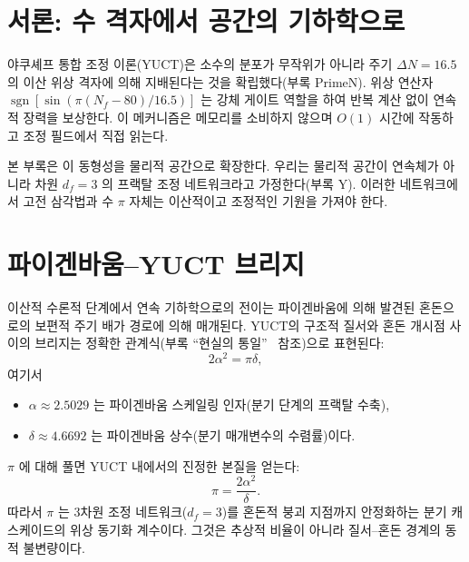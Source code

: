 \documentclass[12pt,a4paper]{article}
\newcommand{\df}{d_{\!f}}
\begin{document}
	\tableofcontents
	\newpage
	
	\section{서론: 수 격자에서 공간의 기하학으로}
	
	야쿠셰프 통합 조정 이론(YUCT)은 소수의 분포가 무작위가 아니라 주기 $\Delta N = 16.5$ 의 이산 위상 격자에 의해 지배된다는 것을 확립했다(부록 PrimeN). 위상 연산자 $\operatorname{sgn}[\sin(\pi(N_f-80)/16.5)]$ 는 강체 게이트 역할을 하여 반복 계산 없이 연속적 장력을 보상한다. 이 메커니즘은 메모리를 소비하지 않으며 $O(1)$ 시간에 작동하고 조정 필드에서 직접 읽는다.
	
	본 부록은 이 동형성을 물리적 공간으로 확장한다. 우리는 물리적 공간이 연속체가 아니라 차원 $\df=3$ 의 프랙탈 조정 네트워크라고 가정한다(부록 Y). 이러한 네트워크에서 고전 삼각법과 수 $\pi$ 자체는 이산적이고 조정적인 기원을 가져야 한다.
	
	\section{파이겐바움–YUCT 브리지}
	\label{sec:bridge}
	
	이산적 수론적 단계에서 연속 기하학으로의 전이는 파이겐바움에 의해 발견된 혼돈으로의 보편적 주기 배가 경로에 의해 매개된다. YUCT의 구조적 질서와 혼돈 개시점 사이의 브리지는 정확한 관계식(부록 ``현실의 통일''~\cite{UnityReality} 참조)으로 표현된다:
	\begin{equation}
		2\alpha^2 = \pi\delta,
		\label{eq:bridge}
	\end{equation}
	여기서
	\begin{itemize}
		\item $\alpha \approx 2.5029$ 는 파이겐바움 스케일링 인자(분기 단계의 프랙탈 수축),
		\item $\delta \approx 4.6692$ 는 파이겐바움 상수(분기 매개변수의 수렴률)이다.
	\end{itemize}
	$\pi$ 에 대해 풀면 YUCT 내에서의 진정한 본질을 얻는다:
	\begin{equation}
		\boxed{\pi = \frac{2\alpha^2}{\delta}}.
		\label{eq:pi-from-feigenbaum}
	\end{equation}
	따라서 $\pi$ 는 3차원 조정 네트워크($\df=3$)를 혼돈적 붕괴 지점까지 안정화하는 분기 캐스케이드의 위상 동기화 계수이다. 그것은 추상적 비율이 아니라 질서–혼돈 경계의 동적 불변량이다.
	
\end{document}
